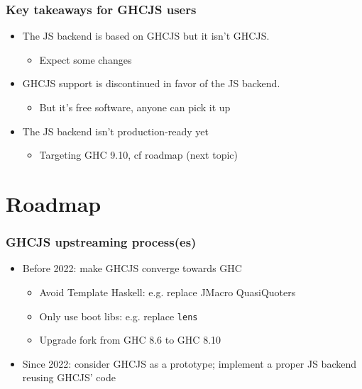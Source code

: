 \documentclass[aspectratio=169]{beamer}
\begin{document}
\begin{frame}
\frametitle{Key takeaways for GHCJS users}
\begin{itemize}
\item The JS backend is based on GHCJS but it isn’t GHCJS.
  \begin{itemize}
    \item Expect some changes
  \end{itemize}
\item GHCJS support is discontinued in favor of the JS backend.
\begin{itemize}
\item But it’s free software, anyone can pick it up
\end{itemize}
\item The JS backend isn't production-ready yet
\begin{itemize}
  \item Targeting GHC 9.10, cf roadmap (next topic)
\end{itemize}
\end{itemize}
\end{frame}

\section{Roadmap}

\begin{frame}
\frametitle{GHCJS upstreaming process(es)}

\begin{itemize}
\item Before 2022: make GHCJS converge towards GHC
\begin{itemize}
\item Avoid Template Haskell: e.g. replace JMacro QuasiQuoters
\item Only use boot libs: e.g. replace \texttt{lens}
\item Upgrade fork from GHC 8.6 to GHC 8.10
\end{itemize}

\item Since 2022: consider GHCJS as a prototype; implement a proper JS backend reusing GHCJS’ code
\end{itemize}
\end{frame}
\end{document}
